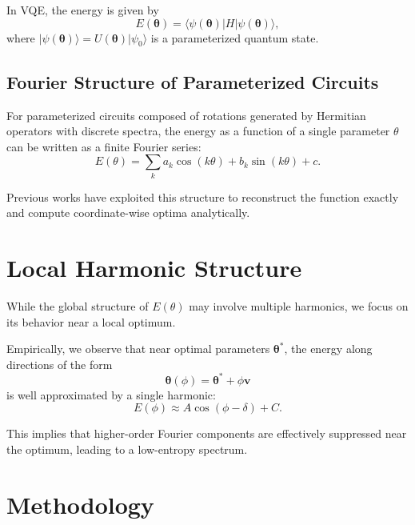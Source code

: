 \documentclass[12pt]{article}
\begin{document}
In VQE, the energy is given by
\begin{equation}
E(\boldsymbol{\theta}) = \langle \psi(\boldsymbol{\theta}) | H | \psi(\boldsymbol{\theta}) \rangle,
\end{equation}
where $|\psi(\boldsymbol{\theta})\rangle = U(\boldsymbol{\theta}) |\psi_0\rangle$ is a parameterized quantum state.

\subsection{Fourier Structure of Parameterized Circuits}

For parameterized circuits composed of rotations generated by Hermitian operators with discrete spectra, the energy as a function of a single parameter $\theta$ can be written as a finite Fourier series:
\begin{equation}
E(\theta) = \sum_{k} a_k \cos(k\theta) + b_k \sin(k\theta) + c.
\end{equation}

Previous works have exploited this structure to reconstruct the function exactly and compute coordinate-wise optima analytically.

\section{Local Harmonic Structure}

While the global structure of $E(\theta)$ may involve multiple harmonics, we focus on its behavior near a local optimum.

Empirically, we observe that near optimal parameters $\boldsymbol{\theta}^*$, the energy along directions of the form
\begin{equation}
\boldsymbol{\theta}(\phi) = \boldsymbol{\theta}^* + \phi \mathbf{v}
\end{equation}
is well approximated by a single harmonic:
\begin{equation}
E(\phi) \approx A \cos(\phi - \delta) + C.
\end{equation}

This implies that higher-order Fourier components are effectively suppressed near the optimum, leading to a low-entropy spectrum.

\section{Methodology}
\end{document}
